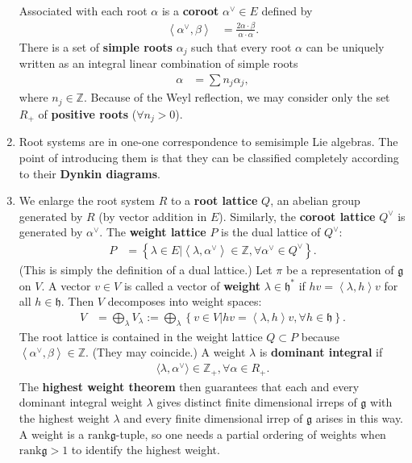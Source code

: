 \documentclass[aps,nofootinbib]{revtex4}
\begin{document}
\begin{enumerate}
Associated with each root $\alpha$ is a \textbf{coroot} $\alpha^{\vee}\in E$
defined by
\begin{align*}
\left\langle \alpha^{\vee},\beta\right\rangle  & =\frac{2\alpha\cdot\beta}{\alpha\cdot\alpha}.
\end{align*}
There is a set of \textbf{simple roots }$\alpha_{j}$ such that every
root $\alpha$ can be uniquely written as an integral linear combination
of simple roots
\begin{align*}
\alpha & =\sum n_{j}\alpha_{j},
\end{align*}
where $n_{j}\in\mathbb{Z}$. Because of the Weyl reflection, we may consider only the set $R_+$ of {\bf positive roots} ($\forall n_{j}>0$).

\item \label{Dynkin diagram} Root systems are in one-one correspondence to semisimple Lie algebras. The point of introducing them is that they can be classified completely according to their {\bf Dynkin diagrams}.

\item \label{weight} We enlarge the root system $R$ to a \textbf{root lattice} $Q$,
an abelian group generated by $R$ (by vector addition in $E$). Similarly,
the \textbf{coroot lattice }$Q^{\vee}$ is generated by $\alpha^{\vee}$.
The \textbf{weight lattice }$P$ is the dual lattice of $Q^{\vee}$:
\begin{align*}
P & =\left\{ \lambda\in E|\left\langle \lambda,\alpha^{\vee}\right\rangle \in\mathbb{Z},\forall\alpha^{\vee}\in Q^{\vee}\right\} .
\end{align*}
(This is simply the definition of a dual lattice.) Let $\pi$ be a
representation of $\mathfrak{g}$ on $V$. A vector $v\in V$ is called
a vector of \textbf{weight} $\lambda\in\mathfrak{h}^{*}$ if $hv=\left\langle \lambda,h\right\rangle v$
for all $h\in\mathfrak{h}$. Then $V$ decomposes into weight spaces:
\begin{align*}
V & =\bigoplus_{\lambda}V_{\lambda}:=\bigoplus_{\lambda}\left\{ v\in V|hv=\left\langle \lambda,h\right\rangle v,\forall h\in\mathfrak{h}\right\} .
\end{align*}
The root lattice is contained in the weight lattice $Q\subset P$
because $\left\langle \alpha^{\vee},\beta\right\rangle \in\mathbb{Z}$.
(They may coincide.) A weight $\lambda$ is {\bf dominant integral} if
\begin{align*}
\langle \lambda,\alpha^{\vee} \rangle \in \mathbb{Z}_+, \forall \alpha \in R_+.
\end{align*}
The {\bf highest weight theorem} then guarantees that each and every dominant integral weight $\lambda$ gives distinct finite dimensional irreps of $\mathfrak{g}$ with the highest weight $\lambda$ and every finite dimensional irrep of $\mathfrak{g}$ arises in this way. A weight is a $\text{rank} \mathfrak{g}$-tuple, so one needs a partial ordering of weights when $\text{rank} \mathfrak{g}>1$ to identify the highest weight.


\end{enumerate}
\end{document}
